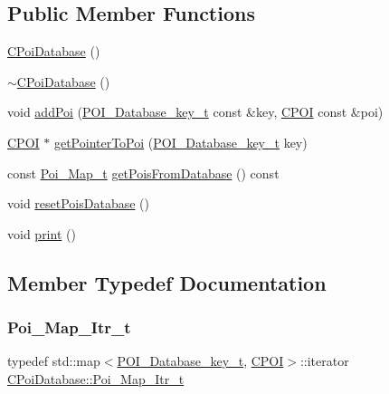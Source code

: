 \subsection*{Public Member Functions}
\begin{DoxyCompactItemize}
\item 
\hyperlink{classCPoiDatabase_a03098c79d2c4958e353658127fa0535e}{C\+Poi\+Database} ()
\item 
\hyperlink{classCPoiDatabase_a01b246bbd0dfa5bf3c94e97b09df92b2}{$\sim$\+C\+Poi\+Database} ()
\item 
void \hyperlink{classCPoiDatabase_a963761cbbaf6ad8f249d5950b428f7eb}{add\+Poi} (\hyperlink{CPoiDatabase_8h_ad55418fc31c1491ccfbd50da54f494a0}{P\+O\+I\+\_\+\+Database\+\_\+key\+\_\+t} const \&key, \hyperlink{classCPOI}{C\+P\+OI} const \&poi)
\item 
\hyperlink{classCPOI}{C\+P\+OI} $\ast$ \hyperlink{classCPoiDatabase_a4320809ce8b8f2cb6d3a9e56d598293c}{get\+Pointer\+To\+Poi} (\hyperlink{CPoiDatabase_8h_ad55418fc31c1491ccfbd50da54f494a0}{P\+O\+I\+\_\+\+Database\+\_\+key\+\_\+t} key)
\item 
const \hyperlink{classCPoiDatabase_ad9ed38adc9bf4250e704cd3d378176a2}{Poi\+\_\+\+Map\+\_\+t} \hyperlink{classCPoiDatabase_a3f5c6705e35e3f543d60fc0ddf9334a8}{get\+Pois\+From\+Database} () const
\item 
void \hyperlink{classCPoiDatabase_aab8efdfbd61515050fb1685d769cf5cd}{reset\+Pois\+Database} ()
\item 
void \hyperlink{classCPoiDatabase_a540c1119ded65c6732fc92728c5b9c14}{print} ()
\end{DoxyCompactItemize}


\subsection{Member Typedef Documentation}
\mbox{\label{classCPoiDatabase_ac9ec3b0a5e8efee92521eeb03aa0b198}} 
\subsubsection{\texorpdfstring{Poi\+\_\+\+Map\+\_\+\+Itr\+\_\+t}{Poi\_Map\_Itr\_t}}
{\footnotesize\ttfamily typedef std\+::map$<$\hyperlink{CPoiDatabase_8h_ad55418fc31c1491ccfbd50da54f494a0}{P\+O\+I\+\_\+\+Database\+\_\+key\+\_\+t}, \hyperlink{classCPOI}{C\+P\+OI}$>$\+::iterator \hyperlink{classCPoiDatabase_ac9ec3b0a5e8efee92521eeb03aa0b198}{C\+Poi\+Database\+::\+Poi\+\_\+\+Map\+\_\+\+Itr\+\_\+t}}

